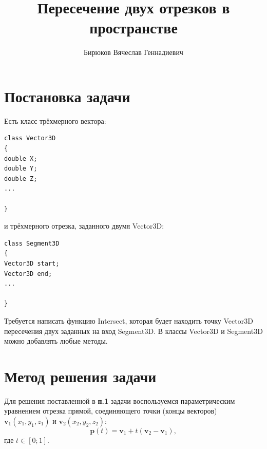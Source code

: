 \documentclass[11pt]{article} %
\title{\textbf{Пересечение двух отрезков в пространстве}}
\author{Бирюков Вячеслав Геннадиевич}
\begin{document}
\maketitle

\section{Постановка задачи}

Есть класс трёхмерного вектора:
\begin{verbatim}
class Vector3D
{
double X;
double Y;
double Z;
...

}
\end{verbatim}
и трёхмерного отрезка, заданного двумя Vector3D:

\begin{verbatim}
class Segment3D
{
Vector3D start;
Vector3D end;
...

}
\end{verbatim}
Требуется написать функцию Intersect, которая будет находить точку Vector3D пересечения двух
заданных на вход Segment3D. В классы Vector3D и Segment3D можно добавлять любые методы.

\section{Метод решения задачи}

Для решения поставленной в \textbf{п.1} задачи воспользуемся параметрическим уравнением отрезка прямой, соединяющего точки (концы векторов) $\mathbf{v}_{1}(x_{1}, y_{1}, z_{1})$ и $\mathbf{v}_{2}(x_{2}, y_{2}, z_{2})$:
\begin{equation}
	\mathbf{p}\left(t\right) = \mathbf{v}_{1} + t\left(\mathbf{v}_{2} - \mathbf{v}_{1}\right), \label{eq:1}
\end{equation}
где $t \in \left[0; 1\right]$.
\end{document}

